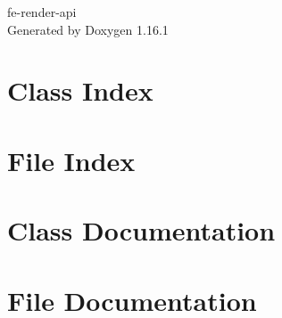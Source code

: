 \documentclass[twoside]{book}
\newcommand{\+}{\discretionary{\mbox{\scriptsize$\hookleftarrow$}}{}{}}
\newcommand{\clearemptydoublepage}{%
    \newpage{\pagestyle{empty}\cleardoublepage}%
  }
\begin{document}
  \raggedbottom
    \hypersetup{pageanchor=false,
                bookmarksnumbered=true,
                pdfencoding=unicode
               }
  \begin{titlepage}
  \vspace*{7cm}
  \begin{center}%
  {\Large fe-\/render-\/api}\\
  \vspace*{1cm}
  {\large Generated by Doxygen 1.16.1}\\
  \end{center}
  \end{titlepage}
  \clearemptydoublepage
  \tableofcontents
  \clearemptydoublepage
  \hypersetup{pageanchor=true}
\chapter{Class Index}

\chapter{File Index}

\chapter{Class Documentation}







\chapter{File Documentation}

  \backmatter
  \newpage
  \clearemptydoublepage
  \printindex
\end{document}
